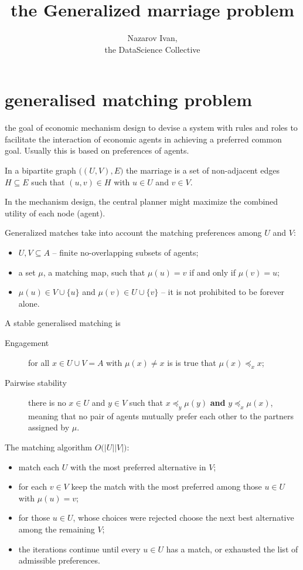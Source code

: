 \documentclass[a4paper]{article}
\title{the Generalized marriage problem}
\author{Nazarov Ivan, \rus{101мНОД(ИССА)}\\the DataScience Collective}
\begin{document}
\maketitle

\section{generalised matching problem} %
\label{sec:generalised_matching_problem}

the goal of economic mechanism design to devise a system with rules and roles
to facilitate the interaction of economic agents in achieving a preferred common goal.
Usually this is based on preferences of agents.

In a bipartite graph $\big((U, V), E\big)$ the marriage is a set of non-adjacent edges
$H\subseteq E$ such that $(u,v)\in H$ with $u\in U$ and $v\in V$.

In the mechanism design, the central planner might maximize the combined utility of each node (agent).

Generalized matches take into account the matching preferences among $U$ and $V$:
\begin{itemize}
	\item $U, V\subseteq A$ -- finite no-overlapping subsets of agents;
	\item a set $\mu$, a matching map, such that $\mu(u) = v$ if and only if $\mu(v)=u$;
	\item $\mu(u)\in V\cup \{u\}$ and $\mu(v)\in U\cup \{v\}$ -- it is not prohibited to be forever alone.
\end{itemize}

A stable generalised matching is 
\begin{description}
	\item[Engagement] for all $x\in U\cup V = A$ with $\mu(x) \neq x$ is is true that $\mu(x)\preceq_x x$;
	\item[Pairwise stability] there is no $x\in U$ and $y\in V$ such that $x\preceq_y \mu(y)$
	\textbf{and} $y\preceq_x \mu(x)$, meaning that no pair of agents mutually prefer each other
	to the partners assigned by $\mu$.
\end{description}

The matching algorithm $O\big(|U||V|\big)$:
\begin{itemize}
	\item match each $U$ with the most preferred alternative in $V$;
	\item for each $v\in V$ keep the match with the most preferred among those $u\in U$ with $\mu(u)=v$;
	\item for those $u\in U$, whose choices were rejected choose the next best alternative among the remaining $V$;
	\item the iterations continue until every $u\in U$ has a match, or exhausted the list of admissible preferences.
\end{itemize}
\end{document}
